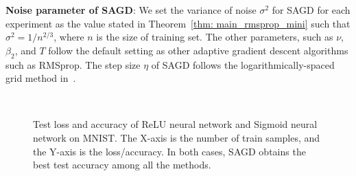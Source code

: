 \documentclass[11pt]{article}
\begin{document}
\vspace{0.05in}
\textbf{Noise parameter of SAGD}: We set the variance of noise $\sigma^2$ for SAGD for each experiment as the value stated in Theorem~\ref{thm: main_rmsprop_mini} such that $\sigma^2 = 1/n^{2/3}$, where $n$ is the size of training set. The other parameters, such as $\nu$, $\beta_2$, and $T$ follow the default setting as other adaptive gradient descent algorithms such as RMSprop. The step size $\eta$ of SAGD follows the logarithmically-spaced grid method in~\citet{wiro17}.



\begin{figure}[t!]
\mbox{
\hspace{-0.1in}
 }
 \caption[]{Test loss and accuracy of ReLU neural network and Sigmoid neural network on MNIST. The X-axis is the number of train samples, and the Y-axis is the loss/accuracy. In both cases, SAGD obtains the best test accuracy among all the methods.} 
 \label{fig:mnist}
\end{figure}
\end{document}
